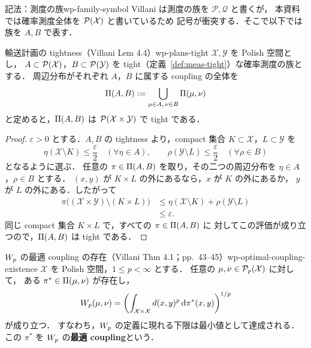 \begin{remark}{記法：測度の族}{wp-family-symbol}
  Villani は測度の族を $\mathcal{P},\mathcal{Q}$ と書くが， %
  本資料では確率測度全体を $\mathcal{P}(\mathcal{X})$ と書いているため
  記号が衝突する．そこで以下では族を $A,B$ で表す．
\end{remark}

\begin{lemma}{輸送計画の tightness（Villani Lem 4.4）}{wp-plans-tight}
  $\mathcal{X},\mathcal{Y}$ を Polish 空間とし，
  $A\subset\mathcal{P}(\mathcal{X})$，$B\subset\mathcal{P}(\mathcal{Y})$ を
  tight（定義~\ref{def:meas-tight}）な確率測度の族とする．
  周辺分布がそれぞれ $A$，$B$ に属する coupling の全体を
  \[
    \Pi(A,B)
    :=\bigcup_{\mu\in A,\,\nu\in B}\Pi(\mu,\nu)
  \]
  と定めると，$\Pi(A,B)$ は $\mathcal{P}(\mathcal{X}\times\mathcal{Y})$
  で tight である．
\end{lemma}

\begin{proof}
  $\varepsilon>0$ とする．$A,B$ の tightness より，compact 集合
  $K\subset\mathcal{X}$，$L\subset\mathcal{Y}$ を
  \[
    \eta(\mathcal{X}\setminus K)\leq\frac{\varepsilon}{2}
    \quad(\forall\eta\in A),
    \qquad
    \rho(\mathcal{Y}\setminus L)\leq\frac{\varepsilon}{2}
    \quad(\forall\rho\in B)
  \]
  となるように選ぶ．
  任意の $\pi\in\Pi(A,B)$ を取り，その二つの周辺分布を
  $\eta\in A$，$\rho\in B$ とする．
  $(x,y)$ が $K\times L$ の外にあるなら，$x$ が $K$ の外にあるか，
  $y$ が $L$ の外にある．したがって
  \[
    \begin{aligned}
      \pi\bigl((\mathcal{X}\times\mathcal{Y})\setminus(K\times L)\bigr)
      &\leq\eta(\mathcal{X}\setminus K)+\rho(\mathcal{Y}\setminus L)\\
      &\leq\varepsilon.
    \end{aligned}
  \]
  同じ compact 集合 $K\times L$ で，すべての $\pi\in\Pi(A,B)$ に
  対してこの評価が成り立つので，$\Pi(A,B)$ は tight である．
\end{proof}

\begin{theorem}{$W_p$ の最適 coupling の存在（Villani Thm 4.1；pp.~43--45）}{wp-optimal-coupling-existence}
  $\mathcal{X}$ を Polish 空間，$1\leq p<\infty$ とする．
  任意の $\mu,\nu\in\mathcal{P}_{p}(\mathcal{X})$ に対して，
  ある $\pi^*\in\Pi(\mu,\nu)$ が存在し，
  \[
    W_p(\mu,\nu)
    =
    \left(
      \int_{\mathcal{X}\times\mathcal{X}}
      d(x,y)^p\,\mathrm{d}\pi^*(x,y)
    \right)^{1/p}
  \]
  が成り立つ．
  すなわち，$W_p$ の定義に現れる下限は最小値として達成される．
  この $\pi^*$ を $W_p$ の\textbf{最適 coupling}という．
\end{theorem}

